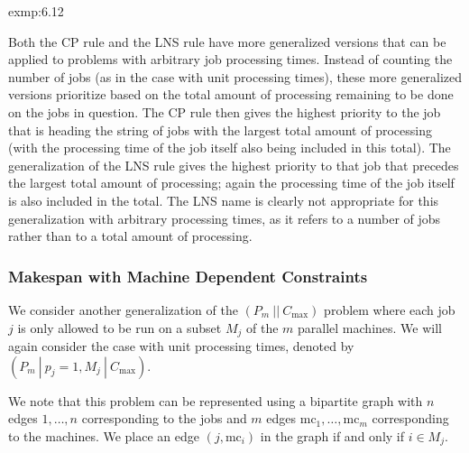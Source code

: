 \begin{exmp}{exmp:6.12}
\begin{center}
    \end{center}
    \vspace{-0.4cm}
\end{exmp}

Both the CP rule and the LNS rule have more generalized versions that
can be applied to problems with arbitrary job processing times. Instead of
counting the number of jobs (as in the case with unit processing times), these
more generalized versions prioritize based on the total amount of processing
remaining to be done on the jobs in question. The CP rule then gives the
highest priority to the job that is heading the string of jobs with the largest
total amount of processing (with the processing time of the job itself also being
included in this total). The generalization of the LNS rule gives the highest
priority to that job that precedes the largest total amount of processing; again
the processing time of the job itself is also included in the total. The LNS name
is clearly not appropriate for this generalization with arbitrary processing times,
as it refers to a number of jobs rather than to a total amount of processing.

\subsubsection{Makespan with Machine Dependent Constraints} \label{subsubsec:6.1.3}
We consider another generalization of the $(P_m~||~C_{\max})$ problem 
where each job $j$ is only allowed to be run on a subset $M_j$ of the $m$ 
parallel machines. We will again consider the case with unit processing times, 
denoted by $(P_m~|~p_j=1, M_j~|~C_{\max})$. 

We note that this problem can be represented using a bipartite graph with $n$ 
edges $1, \dots, n$ corresponding to the jobs and $m$ edges $\text{mc}_1, 
\dots, \text{mc}_m$ corresponding to the machines. We place an edge 
$(j, \text{mc}_i)$ in the graph if and only if $i \in M_j$. 

